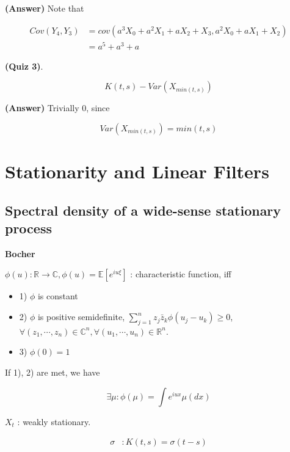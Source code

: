 \documentclass[12pt]{article}
\theoremstyle{nonumberbreak}
\begin{document}
\textbf{(Answer)} Note that 

$$
\begin{aligned}
Cov(Y_4, Y_3) &= cov(a^3 X_0 + a^2 X_1 + a X_2 + X_3, a^2 X_0 + a X_1 + X_2) \\[8pt]
&= a^5 + a^3 + a
\end{aligned}
$$




\textbf{(Quiz 3)}. 


$$
K(t,s) - Var(X_{min(t,s)})
$$


\textbf{(Answer)} Trivially $0$, since

$$
Var(X_{min(t,s)}) = min(t,s)
$$




\pagebreak
\section{Stationarity and Linear Filters}

\subsection{Spectral density of a wide-sense stationary process}


\textbf{Bocher}

$\phi(u): \mathbb{R} \to \mathbb{C}, \phi(u) = \mathbb{E} [e^{iu\xi}]$ : characteristic function, iff

\begin{itemize}
	\item 1) $\phi$ is constant
	\item 2) $\phi$ is positive semidefinite, $\sum_{j=1}^n z_j \bar{z}_k \phi(u_j - u_k) \ge 0$, $\forall (z_1, \cdots, z_n) \in \mathbb{C}^n, \forall (u_1, \cdots, u_n) \in \mathbb{R}^n$.
	\item 3) $\phi(0) = 1$
\end{itemize}

If 1), 2) are met, we have 

$$
\exists \mu: \phi(\mu) = \int e^{iux} \mu (dx)
$$






$X_t$ : weakly stationary. 

$$
\begin{aligned}
\sigma &: K(t,s) = \sigma(t-s) \\[8pt]
\end{aligned}
$$
\end{document}
